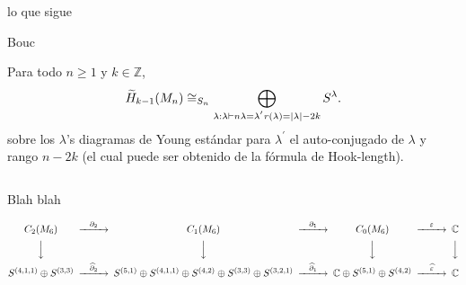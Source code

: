 \documentclass[final,xcolor=svgnames]{beamer}
\begin{document}
\begin{frame}{}
\begin{columns}
\begin{column}{0.5\textwidth}
\begin{block}{lo que sigue}
\begin{scriptsize}







        \end{scriptsize}
      \end{block}

      \begin{block}{Bouc}
        \begin{scriptsize}
          Para todo $n\geq1$ y $k\in \mathbb{Z}$,
          \begin{equation*}
            \widetilde H_{k-1}(M_{n})\cong_{S_{n}}\bigoplus_{\lambda:\lambda\vdash n\\
              \lambda=\lambda^{'}\\r(\lambda)=\mid \lambda \mid-2k} S^{\lambda}.
          \end{equation*}
          sobre los $\lambda$'s diagramas de Young estándar para $\lambda^{'}$
          el auto-conjugado de $\lambda$ y rango $n-2k$ (el cual puede ser
          obtenido de la fórmula de Hook-length).
        \end{scriptsize}
      \end{block}
    \end{column}
  \end{columns}

  \vfill

  \begin{block}{Blah blah}
    \begin{tiny}
    \[
    \begin{CD}
      C_{2}(M_{6}) @>{\partial_{2}}>> C_{1}(M_{6}) @>{\partial_{1}}>> C_{0}(M_{6}) @>{\varepsilon}>> \mathbb{C}\\
      @VVV   @VVV   @VVV   @VVV    \\
      S^{(4,1,1)}\oplus S^{(3,3)} @>{\widehat\partial_{2}}>>
      S^{(5,1)}\oplus S^{(4,1,1)}\oplus S^{(4,2)}\oplus S^{(3,3)}\oplus S^{(3,2,1)} @>{\widehat\partial_{1}}>> 
      \mathbb{C} \oplus S^{(5,1)}\oplus S^{(4,2)} @>{\widehat \varepsilon}>>  \mathbb{C}
    \end{CD}
    \]
    \end{tiny}
  \end{block}
\end{frame}
\end{document}
